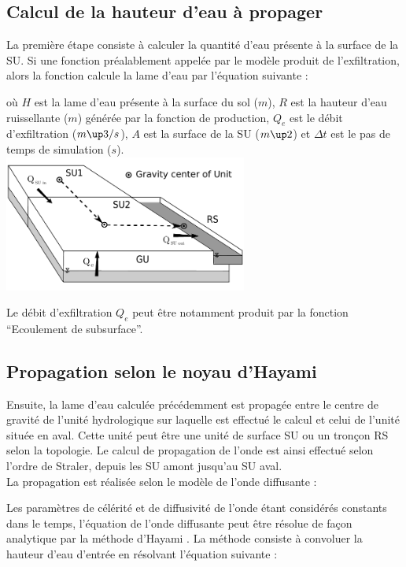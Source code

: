 \subsection{Calcul de la hauteur d'eau à propager}
La première étape consiste à calculer la quantité d'eau présente à la surface de la SU. Si une fonction préalablement appelée par le modèle produit de l'exfiltration, alors la fonction calcule la lame d'eau par l'équation suivante :



où $H$ est la lame d'eau présente à la surface du sol ($m$), $R$ est la hauteur d'eau ruissellante ($m$) générée par la fonction de production, $Q_e$ est le débit d'exfiltration ($m\up3/s$), $A$ est la surface de la SU ($m\up2$) et $\Delta t$ est le pas de temps de simulation ($s$).\\

\includegraphics[width=8cm]{doc/common/Schema_GU_RS_SU_Hayami_SU.pdf}

Le débit d'exfiltration $Q_e$ peut être notamment produit par la fonction ``Ecoulement de subsurface''.\\


\subsection{Propagation selon le noyau d'Hayami}
Ensuite, la lame d'eau calculée précédemment est propagée entre le centre de gravité de l'unité hydrologique sur laquelle est effectué le calcul et celui de l'unité située en aval. Cette unité peut être une unité de surface SU ou un tronçon RS selon la topologie. Le calcul de propagation de l'onde est ainsi effectué selon l'ordre de Straler, depuis les SU amont jusqu'au SU aval.\\

La propagation est réalisée selon le modèle de l'onde diffusante :



Les paramètres de célérité et de diffusivité de l'onde étant considérés constants dans le temps, l'équation de l'onde diffusante peut être résolue de façon analytique par la méthode d'Hayami \cite{Moussa1996}. La méthode consiste à convoluer la hauteur d'eau d'entrée en résolvant l'équation suivante :

